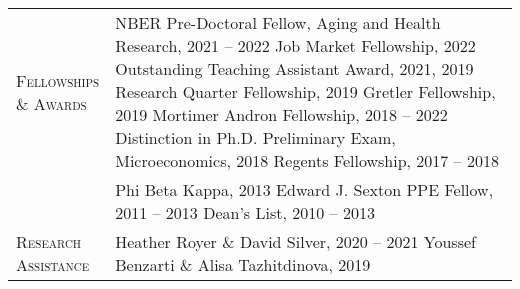 \documentclass[11pt]{article}
\begin{document}
\begin{tabularx}{\textwidth}{@{}Y Z@{}}
	\textsc{Fellowships \newline \& Awards} \vspace{20pt} & 
	\underline{}
	\vspace{3pt} \newline
	NBER Pre-Doctoral Fellow, Aging and Health Research, 2021 -- 2022
	\vspace{15pt} \newline
	\underline{}
	\vspace{3pt} \newline
	Job Market Fellowship, 2022
	\vspace{3pt} \newline
	Outstanding Teaching Assistant Award, 2021, 2019
	\vspace{3pt} \newline
	Research Quarter Fellowship, 2019
	\vspace{3pt} \newline
	Gretler Fellowship, 2019
	\vspace{3pt} \newline
	Mortimer Andron Fellowship, 2018 -- 2022
	\vspace{3pt} \newline 
	Distinction in Ph.D. Preliminary Exam, Microeconomics, 2018
	\vspace{3pt} \newline
	Regents Fellowship, 2017 -- 2018
	\\ \newpage &
	\underline{}
	\vspace{3pt} \newline
	Phi Beta Kappa, 2013
	\vspace{3pt} \newline
	Edward J. Sexton PPE Fellow, 2011 -- 2013
	\vspace{3pt} \newline
	Dean's List, 2010 -- 2013
	\\[20pt]
	

	\textsc{Research \newline Assistance} \vspace{20pt} & 
	Heather Royer \& David Silver, 2020 -- 2021 
	\vspace{3pt} \newline 
	Youssef Benzarti \& Alisa Tazhitdinova, 2019
	\\[20pt]
	

\end{tabularx}
\end{document}
